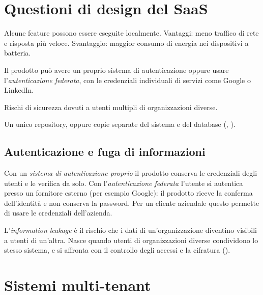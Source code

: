 \section{Questioni di design del SaaS}
\label{sec:cloud-design}

\begin{description}[leftmargin=0pt, style=unboxed]
  \item[Elaborazione locale o remota.] Alcune feature possono essere eseguite localmente. Vantaggi: meno traffico di rete
    e risposta più veloce. Svantaggio: maggior consumo di energia nei dispositivi a batteria.
  \item[Autenticazione.] Il prodotto può avere un proprio sistema di autenticazione oppure usare
    l'\emph{autenticazione federata}, con le credenziali individuali di servizi come Google o LinkedIn.
  \item[Information leakage.] Rischi di sicurezza dovuti a utenti multipli di organizzazioni diverse.
  \item[Gestione del database: multi-tenant o multi-instance.] Un unico repository, oppure copie separate del sistema e
    del database (, ).
\end{description}

\subsection{Autenticazione e fuga di informazioni\aggiunta}

Con un \emph{sistema di autenticazione proprio} il prodotto conserva le credenziali degli utenti e le verifica da
solo. Con l'\emph{autenticazione federata} l'utente si autentica presso un fornitore esterno (per esempio Google): il
prodotto riceve la conferma dell'identità e non conserva la password. Per un cliente aziendale questo permette di
usare le credenziali dell'azienda.

L'\emph{information leakage} è il rischio che i dati di un'organizzazione diventino visibili a utenti di un'altra.
Nasce quando utenti di organizzazioni diverse condividono lo stesso sistema, e si affronta con il controllo degli
accessi e la cifratura ().

\section{Sistemi multi-tenant}
\label{sec:cloud-multitenant}

